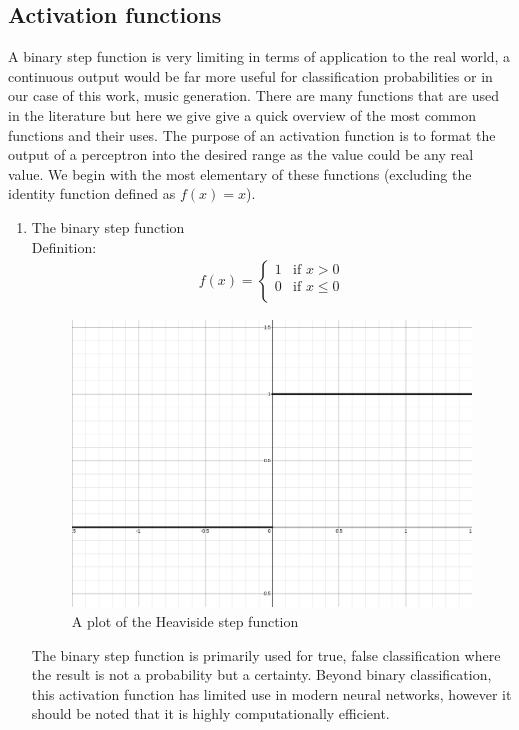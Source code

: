 \documentclass{article}
\begin{document}
\subsection{Activation functions}
\label{sec:activationfuncs}
A binary step function is very limiting in terms of application to the real world, a continuous output would be far more useful for classification probabilities or in our case of this work, music generation. There are many functions that are used in the literature but here we give give a quick overview of the most common functions and their uses. The purpose of an activation function is to format the output of a perceptron into the desired range as the value could be any real value. We begin with the most elementary of these functions (excluding the identity function defined as $f(x) = x$). 
\begin{enumerate}
\item The binary step function \\
Definition:
\begin{align*}
f(x) = 
\begin{cases}
 1 & \text{if } x > 0 \\
 0 & \text{if } x \leq 0 \\
\end{cases}
\end{align*}
\begin{figure}[H]
\centering
\caption{A plot of the Heaviside step function}
\includegraphics[scale=0.2]{heaviside.png}
\end{figure}
The binary step function is primarily used for true, false classification where the result is not a probability but a certainty. Beyond binary classification, this activation function has limited use in modern neural networks, however it should be noted that it is highly computationally efficient. 

\end{enumerate}
\end{document}
